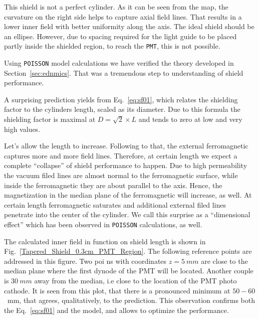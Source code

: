 \documentclass[12pt]{article}
\begin{document}

This  shield is not a perfect cylinder. As it can be seen from the map,
the curvature on the right side helps to capture axial field lines.
That results in a lower inner field with better  uniformity 
along the axis. The ideal shield should 
be an ellipse. However, due to spacing required for the light guide to
be placed partly inside the shielded region, to reach the {\tt PMT}, 
this is not possible.


Using {\tt POISSON} model  calculations we have  verified the 
theory developed in Section~\ref{sec:ednmics}.
That was a tremendous step to understanding of shield performance.

  A surprising  prediction  yields from  
Eq.~\ref{eq:sf01}, which  relates the shielding factor 
 to the cylinders length,  scaled as its diameter.
Due to this formula   the shielding factor is
maximal  at $D =\sqrt{2}\times L$ and tends to zero 
at low and very high values. 

Let's allow the length to increase. Following to that, the external 
ferromagnetic  captures more and more field lines. Therefore, 
at  certain length  we expect a   complete ``collapse'' 
of shield performance to happen.
Due to high permeability the vacuum  filed lines are almost normal
to the ferromagnetic surface, while 
inside  the ferromagnetic they  are about  parallel to the axis.
Hence, the  magnetization in the median plane of the 
ferromagnetic  will increase, as well. 
At certain length ferromagnetic saturates and 
additional external filed lines penetrate 
into the center of the cylinder.  We call this surprise 
as a ``dimensional effect'' which has been observed
in {\tt POISSON} calculations, as well.


The calculated  inner field  in function on shield length is shown in
Fig.~\ref{Tapered_Shield_0.3cm_PMT_Region}. The following  reference points 
are addressed in this figure. Two poi ns with coordinates $z=5~mm$
  are close to the median plane 
where the first dynode of the PMT will be located. 
Another couple is $30~mm$ away from the median, 
i.e close to the location of the PMT photo cathode.
It is  seen from this plot, that there is a pronounced 
minimum  at $50-60$~mm, that  agrees, qualitatively,      
to the prediction. This observation  confirms both the Eq.~\ref{eq:sf01}
and the model, and allows to optimize the performance.
\end{document}
